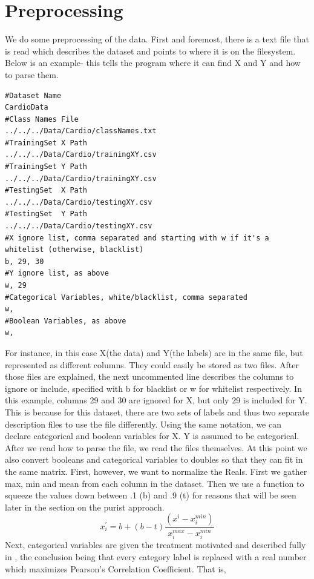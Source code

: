 \section{Preprocessing}
We do some preprocessing of the data.  First and foremost, there is a text file that is read which describes the dataset and points to where it is on the filesystem.  Below is an example- this tells the program where it can find X and Y and how to parse them.\pagebreak
\begin{lstlisting}[language=config]
#Dataset Name
CardioData
#Class Names File
../../../Data/Cardio/classNames.txt
#TrainingSet X Path
../../../Data/Cardio/trainingXY.csv
#TrainingSet Y Path
../../../Data/Cardio/trainingXY.csv
#TestingSet  X Path
../../../Data/Cardio/testingXY.csv
#TestingSet  Y Path
../../../Data/Cardio/testingXY.csv
#X ignore list, comma separated and starting with w if it's a whitelist (otherwise, blacklist)
b, 29, 30
#Y ignore list, as above
w, 29
#Categorical Variables, white/blacklist, comma separated
w, 
#Boolean Variables, as above
w, 
\end{lstlisting}
For instance, in this case X(the data) and Y(the labels) are in the same file, but represented as different columns.  They could easily be stored as two files.  After those files are explained, the next uncommented line describes the columns to ignore or include, specified with b for blacklist or w for whitelist respectively.  In this example, columns 29 and 30 are ignored for X, but only 29 is included for Y.  This is because for this dataset, there are two sets of labels and thus two separate description files to use the file differently.  Using the same notation, we can declare categorical and boolean variables for X.  Y is assumed to be categorical.\\
After we read how to parse the file, we read the files themselves.  At this point we also convert booleans and categorical variables to doubles so that they can fit in the same matrix.  First, however, we want to normalize the Reals.  First we gather max, min and mean from each column in the dataset.  Then we use a function to squeeze the values down between .1 (b) and .9 (t) for reasons that will be seen later in the section on the purist approach.  
$$x_i^{\prime} = b+(b-t)\frac{(x^i-x_i^{min})}{x_i^{max}-x_i^{min}}$$ Next, categorical variables are given the treatment motivated and described fully in \cite{zhang_visual_2015}, the conclusion being that every category label is replaced with a real number which maximizes Pearson's Correlation Coefficient.  That is,
